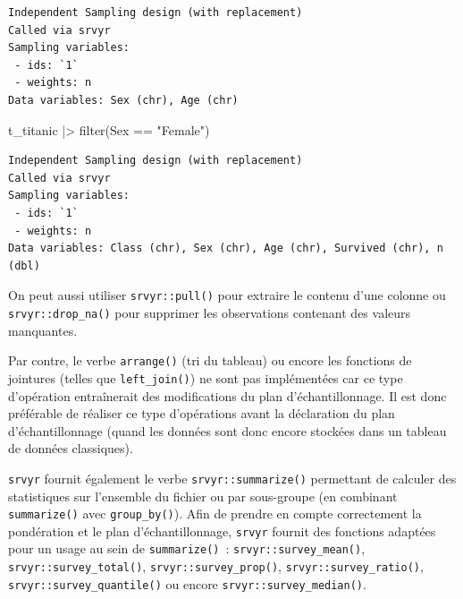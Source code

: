 \documentclass[
  letterpaper,
  DIV=11,
  numbers=noendperiod,
  oneside]{scrreprt}
\newenvironment{Shaded}{\begin{snugshade}}{\end{snugshade}}
\newcommand{\FunctionTok}[1]{\textcolor[rgb]{0.28,0.35,0.67}{#1}}
\newcommand{\NormalTok}[1]{\textcolor[rgb]{0.00,0.23,0.31}{#1}}
\newcommand{\SpecialCharTok}[1]{\textcolor[rgb]{0.37,0.37,0.37}{#1}}
\newcommand{\StringTok}[1]{\textcolor[rgb]{0.13,0.47,0.30}{#1}}
\begin{document}
\begin{verbatim}
Independent Sampling design (with replacement)
Called via srvyr
Sampling variables:
 - ids: `1`
 - weights: n
Data variables: Sex (chr), Age (chr)
\end{verbatim}

\begin{Shaded}
\begin{Highlighting}[]
\NormalTok{t\_titanic }\SpecialCharTok{|\textgreater{}} \FunctionTok{filter}\NormalTok{(Sex }\SpecialCharTok{==} \StringTok{"Female"}\NormalTok{)}
\end{Highlighting}
\end{Shaded}

\begin{verbatim}
Independent Sampling design (with replacement)
Called via srvyr
Sampling variables:
 - ids: `1`
 - weights: n
Data variables: Class (chr), Sex (chr), Age (chr), Survived (chr), n (dbl)
\end{verbatim}

On peut aussi utiliser \texttt{srvyr::pull()} pour extraire le contenu
d'une colonne ou \texttt{srvyr::drop\_na()} pour supprimer les
observations contenant des valeurs manquantes.

\begin{tcolorbox}[enhanced jigsaw, colbacktitle=quarto-callout-warning-color!10!white, opacityback=0, toprule=.15mm, colback=white, coltitle=black, bottomtitle=1mm, toptitle=1mm, titlerule=0mm, rightrule=.15mm, title=\textcolor{quarto-callout-warning-color}{\faExclamationTriangle}\hspace{0.5em}{Avertissement}, breakable, bottomrule=.15mm, opacitybacktitle=0.6, arc=.35mm, left=2mm, leftrule=.75mm, colframe=quarto-callout-warning-color-frame]

Par contre, le verbe \texttt{arrange()} (tri du tableau) ou encore les
fonctions de jointures (telles que \texttt{left\_join()}) ne sont pas
implémentées car ce type d'opération entraînerait des modifications du
plan d'échantillonnage. Il est donc préférable de réaliser ce type
d'opérations avant la déclaration du plan d'échantillonnage (quand les
données sont donc encore stockées dans un tableau de données
classiques).

\end{tcolorbox}

\texttt{srvyr} fournit également le verbe \texttt{srvyr::summarize()}
permettant de calculer des statistiques sur l'ensemble du fichier ou par
sous-groupe (en combinant \texttt{summarize()} avec
\texttt{group\_by()}). Afin de prendre en compte correctement la
pondération et le plan d'échantillonnage, \texttt{srvyr} fournit des
fonctions adaptées pour un usage au sein de \texttt{summarize()}~:
\texttt{srvyr::survey\_mean()}, \texttt{srvyr::survey\_total()},
\texttt{srvyr::survey\_prop()}, \texttt{srvyr::survey\_ratio()},
\texttt{srvyr::survey\_quantile()} ou encore
\texttt{srvyr::survey\_median()}.
\end{document}
